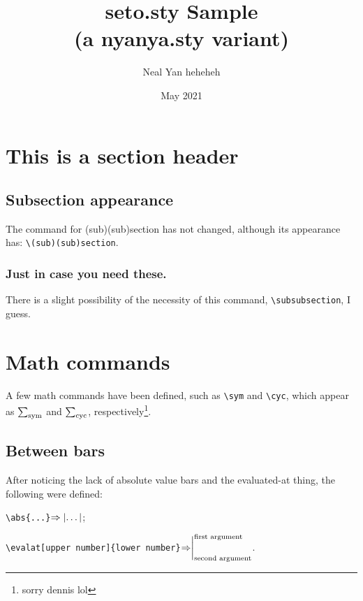 \documentclass{article}
\title{seto.sty Sample\\(a nyanya.sty variant)}
\author{Neal Yan heheheh}
\date{May 2021}
\begin{document}
\maketitle

\toc

\section{This is a section header}
\subsection{Subsection appearance}

The command for (sub)(sub)section has not changed, although its appearance has: \texttt{\textbackslash(sub)(sub)section}.

\subsubsection{Just in case you need these.}

There is a slight possibility of the necessity of this command, \texttt{\textbackslash subsubsection}, I guess.

\section{Math commands}

A few math commands have been defined, such as \texttt{\textbackslash sym} and \texttt{\textbackslash cyc}, which appear as $\sym$ and $\cyc$, respectively\footnote{sorry dennis lol}.

\subsection{Between bars}

After noticing the lack of absolute value bars and the evaluated-at thing, the following were defined: 

\texttt{\textbackslash abs\{...\}}$\Rightarrow\abs{\dots}$;

\texttt{\textbackslash evalat[upper number]\{lower number\}}$\Rightarrow\evalat[\text{first argument}]{\text{second argument}}$.
\end{document}
